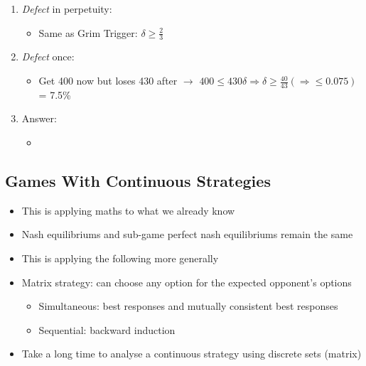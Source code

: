 \documentclass[11pt, english]{article}
\begin{document}
	\begin{enumerate}                              
        \setlength\itemsep{0cm}                                   
                \item \textit{Defect} in perpetuity:                         
                \begin{itemize}                        
			\item Same as Grim Trigger: $\delta\ge\frac{2}{3}$
                \end{itemize}   
                \item \textit{Defect} once:
                \begin{itemize}       
			\item Get 400 now but loses 430 after $\rightarrow$ $400\le430\delta\Rightarrow\delta\ge\frac{40}{43}(\Rightarrow\le0.075)$ = 7.5\%
                \end{itemize}                              
                \item Answer:
                \begin{itemize}
                        \item {}
		\end{itemize}
        \end{enumerate}


	\newpage

	\subsection{Games With Continuous Strategies}

	\begin{itemize}
	\setlength\itemsep{0cm}
		\item This is applying maths to what we already know
		\item Nash equilibriums and sub-game perfect nash equilibriums remain the same
		\item This is applying the following more generally  
		\item Matrix strategy: can choose any option for the expected opponent’s options
		\begin{itemize}
			\item Simultaneous: best responses and mutually consistent best responses
			\item Sequential: backward induction 
		\end{itemize}
		\item Take a long time to analyse a continuous strategy using discrete sets (matrix)
	\end{itemize}
\end{document}
